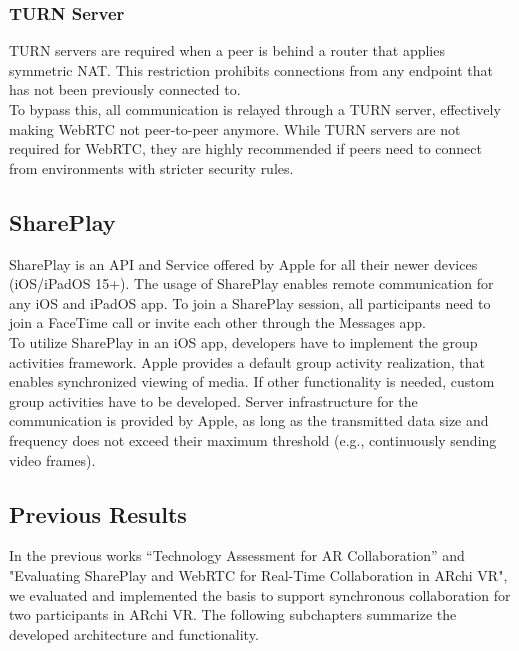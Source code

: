 \documentclass{article}
\begin{document}
\subsubsection{TURN Server}
TURN servers are required when a peer is behind a router that applies symmetric NAT. This restriction prohibits connections from any endpoint that has not been previously connected to.\\
To bypass this, all communication is relayed through a TURN server, effectively making WebRTC not peer-to-peer anymore. While TURN servers are not required for WebRTC, they are highly recommended if peers need to connect from environments with stricter security rules.

\subsection{SharePlay}
SharePlay is an API and Service offered by Apple for all their newer devices (iOS/iPadOS 15+). The usage of SharePlay enables remote communication for any iOS and iPadOS app. To join a SharePlay session, all participants need to join a FaceTime call or invite each other through the Messages app.\\
To utilize SharePlay in an iOS app, developers have to implement the group activities framework. Apple provides a default group activity realization, that enables synchronized viewing of media. If other functionality is needed, custom group activities have to be developed. Server infrastructure for the communication is provided by Apple, as long as the transmitted data size and frequency does not exceed their maximum threshold (e.g., continuously sending video frames).

\subsection{Previous Results}
In the previous works “Technology Assessment for AR Collaboration” \cite{moreno_technologieabklarung_2022} and "Evaluating SharePlay and WebRTC for Real-Time Collaboration in ARchi VR"\cite{moreno_evaluating_2022}, we evaluated and implemented the basis to support synchronous collaboration for two participants in ARchi VR. The following subchapters summarize the developed architecture and functionality.
\end{document}
